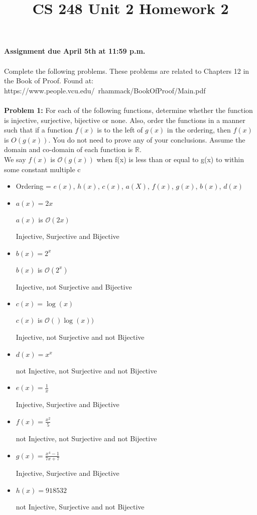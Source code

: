 \documentclass[12pt]{article}
\title{CS 248 Unit 2 Homework 2}
\def\R{\mathbb R} %
\begin{document}
\textbf{Assignment due April 5th at 11:59 p.m. \\ \\
}Complete the following problems. These problems are related to Chapters 12 in the Book of Proof. Found at: \\ https://www.people.vcu.edu/~rhammack/BookOfProof/Main.pdf \\ \\

{\bf Problem 1:} For each of the following functions, determine whether the function is injective, surjective, bijective or none. Also, order the functions in a manner such that if a function $f(x)$ is to the left of $g(x)$ in the ordering, then $f(x)$ is $O(g(x)).$ You do not need to prove any of your conclusions. Assume the domain and co-domain of each function is $\R$.\\

We say $f(x)$ is $\mathcal{O}(g(x))$ when f(x) is less than or
equal to g(x) to within some constant multiple c

\begin{itemize}

    \item Ordering = $e(x)$, $h(x)$, $c(x)$, $a(X)$, $f(x)$, $g(x)$, $b(x)$, $d(x)$

    \item $a(x) = 2x$
    
    $a(x)$ is $\mathcal{O}(2x)$
    
    Injective, Surjective and Bijective

    \item $b(x) = 2^x$
    
    $b(x)$ is $\mathcal{O}(2^x)$
    
    Injective, not Surjective and Bijective

    \item $c(x) = \log(x)$
    
    $c(x)$ is $\mathcal{O}()\log(x))$
    
    Injective, not Surjective and not Bijective

    \item $d(x) = x^x$
    
    not Injective, not Surjective and not Bijective

    \item $e(x) = \frac{1}{x}$
    
    Injective, Surjective and Bijective

    \item $f(x) = \frac{x^2}{5}$
    
    not Injective, not Surjective and not Bijective

    \item $g(x) = \frac{x^4-1}{7x+7}$
    
    Injective, Surjective and Bijective

    \item $h(x) = 918532$
    
    not Injective, Surjective and not Bijective

\end{itemize} 
\end{document}
